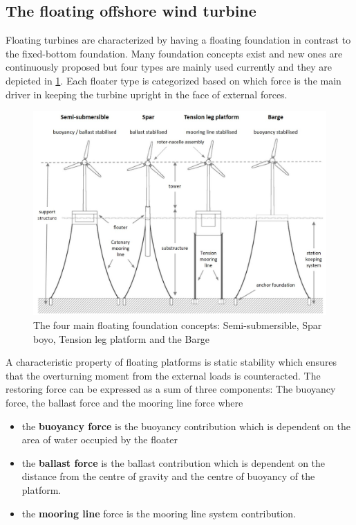 \subsection{The floating offshore wind turbine} \label{sec:intro_theFOWT}
Floating turbines are characterized by having a floating foundation in contrast to the fixed-bottom foundation. Many foundation concepts exist and new ones are continuously proposed but four types are mainly used currently and they are depicted in \cref{fig:floating_concepts}. Each floater type is categorized based on which force is the main driver in keeping the turbine upright in the face of external forces.
\begin{figure}[ht]
	\centering
	\includegraphics[width=1\linewidth]{Graphics/FloatingFoundationConcepts.jpg}
	\caption{The four main floating foundation concepts: Semi-submersible, Spar boyo, Tension leg platform and the Barge \cite{DNV-GL2018}}
	\label{fig:floating_concepts}
\end{figure}
A characteristic property of floating platforms is static stability which ensures that the overturning moment from the external loads is counteracted. The restoring force can be expressed as a sum of three components: The buoyancy force, the ballast force and the mooring line force where
\begin{itemize}
	\item the \textbf{buoyancy force} is the buoyancy contribution which is dependent on the area of water occupied by the floater
	\item the \textbf{ballast force} is the ballast contribution which is dependent on the distance from the centre of gravity and the centre of buoyancy of the platform.
	\item the \textbf{mooring line} force is the mooring line system contribution.
\end{itemize}
